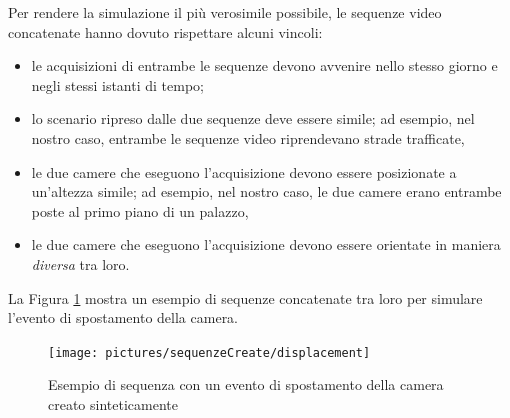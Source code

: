 Per rendere la simulazione il pi\`u verosimile possibile, le sequenze video concatenate hanno dovuto rispettare alcuni vincoli:
\begin{itemize}
	\item le acquisizioni di entrambe le sequenze devono avvenire nello stesso giorno e negli stessi istanti di tempo;
	\item lo scenario ripreso dalle due sequenze deve essere simile; ad esempio, nel nostro caso, entrambe le sequenze video riprendevano strade trafficate,
	\item le due camere che eseguono l'acquisizione devono essere posizionate a un'altezza simile; ad esempio, nel nostro caso, le due camere erano entrambe poste al primo piano di un palazzo,
	\item le due camere che eseguono l'acquisizione devono essere orientate in maniera \textit{diversa} tra loro.
\end{itemize}
La Figura \ref{fig:syntDispl} mostra un esempio di sequenze concatenate tra loro per simulare l'evento di spostamento della camera.
\begin{figure}[tb]
	\centering
	\texttt{[image: pictures/sequenzeCreate/displacement]}
	\caption{Esempio di sequenza con un evento di spostamento della camera creato sinteticamente}
	\label{fig:syntDispl}
\end{figure}

